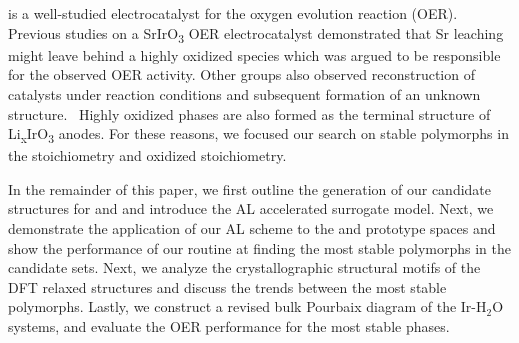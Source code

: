 is a well-studied electrocatalyst for the oxygen evolution reaction (OER).
\cite{Seitz2016,Lee2012a,McCrory2015,Trotochaud2012,Danilovic2014,Carmo2013,Miles1978,Beni1979}
%
Previous studies on a SrIrO\textsubscript{3} OER electrocatalyst demonstrated that Sr leaching might leave behind a highly oxidized  species which was argued to be responsible for the observed OER activity.
\cite{Seitz2016}
%
Other groups also observed reconstruction of \IrOx catalysts under reaction conditions and subsequent formation of an unknown structure.~\cite{Pearce2017}
%
Highly oxidized \IrOthree phases are also formed as the terminal structure of Li\textsubscript{x}IrO\textsubscript{3} anodes.\cite{Pearce2017}
%
For these reasons, we focused our search on stable polymorphs in the \IrOtwo stoichiometry and  oxidized \IrOthree stoichiometry.
%
%


%
%
In the remainder of this paper, we first outline the generation of our candidate structures for \IrOtwo and \IrOthree and introduce the AL accelerated surrogate model.
%
Next, we demonstrate the application of our AL scheme to the \IrOtwo and \IrOthree prototype spaces and show the performance of our routine at finding the most stable polymorphs in the candidate sets.
%
Next, we analyze the crystallographic structural motifs of the DFT relaxed structures and discuss the trends between the most stable polymorphs.
%
Lastly, we construct a revised bulk Pourbaix diagram of the Ir-H$_2$O systems, and evaluate the OER performance for the most stable phases.
%
